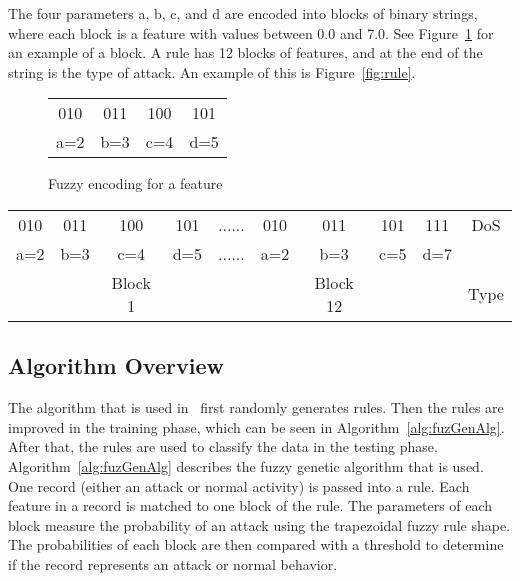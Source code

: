 \documentclass{sig-alternate}
\begin{document}
The four parameters a, b, c, and d are encoded into blocks of binary strings, where each block is a feature with values between 0.0 and 7.0. See Figure~\ref{fig:fuzEncodingForFeature} for an example of a block. A rule has 12 blocks of features, and at the end of the string is the type of attack. An example of this is Figure~\ref{fig:rule}.

\begin{figure}
\centering
\caption{Fuzzy encoding for a feature}
\vspace{0.20cm}
\begin{tabular}{|cccc|} \hline
010 & 011 & 100 & 101\\
a=2 & b=3 & c=4 & d=5\\
\hline\end{tabular}
\label{fig:fuzEncodingForFeature}
\end{figure}

\begin{figure*}
\centering
\caption{A rule with 12 blocks of features}
\vspace{0.20cm}
\begin{tabular}{|cccc|c|cccc|c|} \hline
010 & 011 & 100 & 101   & ...... & 010 & 011 & 101 & 111   & DoS\\
a=2 & b=3 & c=4 & d=5   & ...... & a=2 & b=3 & c=5 & d=7   &\\ 
    &     & Block 1&    &        &     & Block 12& &       & Type\\
\hline\end{tabular}
\label{fig:rule}
\end{figure*}




\subsection{Algorithm Overview}
The algorithm that is used in~\cite{6496342, 6559603} first randomly generates rules. Then the rules are improved in the training phase, which can be seen in Algorithm~\ref{alg:fuzGenAlg}. After that, the rules are used to classify the data in the testing phase. Algorithm~\ref{alg:fuzGenAlg} describes the fuzzy genetic algorithm that is used. One record (either an attack or normal activity) is passed into a rule. Each feature in a record is matched to one block of the rule. The parameters of each block measure the probability of an attack using the trapezoidal fuzzy rule shape. The probabilities of each block are then compared with a threshold to determine if the record represents an attack or normal behavior.
\end{document}
